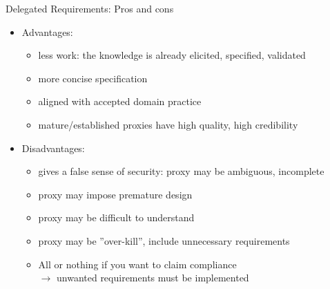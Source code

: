 \begin{Slide}{Delegated Requirements: Pros and cons}
\begin{itemize}
\item Advantages:
\begin{itemize}
\item less work: the knowledge is already elicited, specified, validated
\item more concise specification
\item aligned with accepted domain practice
\item mature/established proxies have high quality, high credibility

\end{itemize}
\item Disadvantages:
\begin{itemize}
\item gives a false sense of security: proxy may be ambiguous, incomplete
\item proxy may impose premature design
\item proxy may be difficult to understand
\item proxy may be ''over-kill'', include unnecessary requirements
\item All or nothing if you want to claim compliance \\$\rightarrow$ unwanted requirements must be implemented


\end{itemize}
\end{itemize}
\end{Slide}